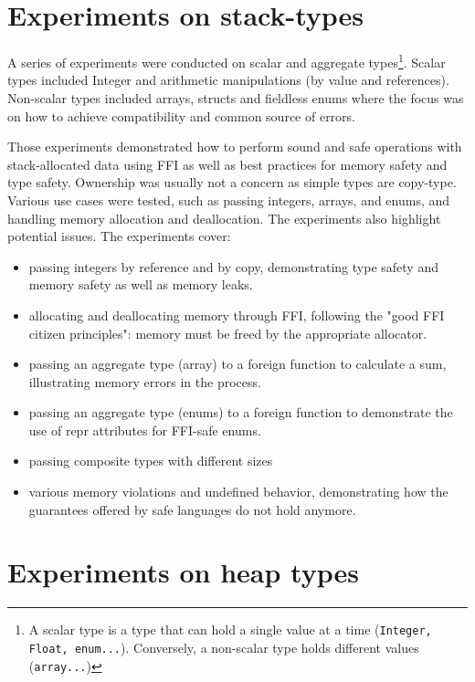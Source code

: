 \documentclass[nomenclature, english, bibtex]{kththesis}
\begin{document}
\section{Experiments on stack-types}
\label{sec:experimentstack}
A series of experiments were conducted on scalar and aggregate types\footnote{A scalar type is a type that can hold a single value at a time (\texttt{Integer, Float, enum...}). Conversely, a non-scalar type holds different values (\texttt{array...})}. Scalar types included Integer and arithmetic manipulations (by value and references). Non-scalar types included arrays, structs and fieldless enums where the focus was on how to achieve compatibility and common source of errors.

Those experiments demonstrated how to perform sound and safe operations with stack-allocated data using \gls{FFI}
as well as best practices for memory safety and type safety. Ownership was usually not a concern as simple types are \gls{copy-type}.
Various use cases were tested, such as passing integers, arrays, and enums, and handling memory allocation and deallocation. The experiments also highlight potential issues. The experiments cover:

\begin{itemize}
    \item passing integers by reference and by copy, demonstrating type safety and memory safety as well as memory leaks.
    \item allocating and deallocating memory through FFI, following the "good FFI citizen principles"\cite{gjengset_rust_2021}: memory must be freed by the appropriate allocator.
    \item passing an aggregate type (array) to a foreign function to calculate a sum, illustrating memory errors in the process.
     \item passing an aggregate type (enums) to a foreign function to demonstrate the use of repr attributes for FFI-safe enums.
     \item passing composite types with different sizes
     \item various memory violations and undefined behavior, demonstrating how the guarantees offered by safe languages do not hold anymore.
\end{itemize}
 
\section{Experiments on heap types}
\label{sec:experimentsheap}
\end{document}
